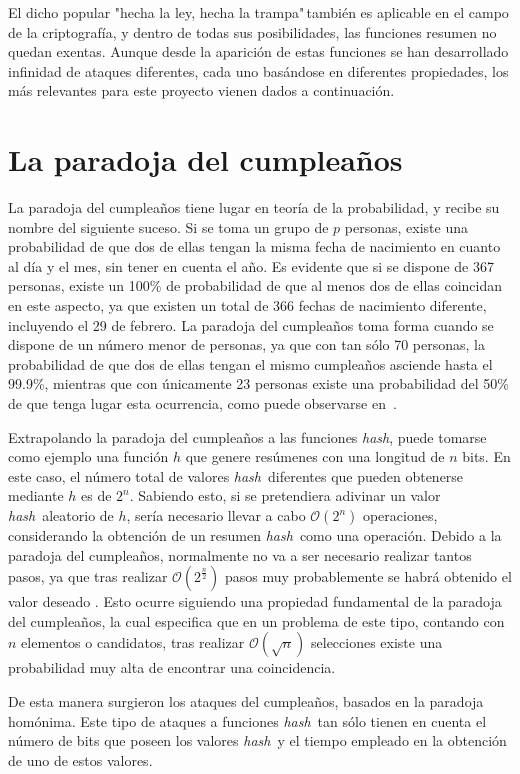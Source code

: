 \documentclass[12pt,spanish,listoffigures,listoftables,listofalgorithms]{tfgetsinf}
\newcommand{\hash}{\textit{hash}}
\begin{document}
El dicho popular "hecha la ley, hecha la trampa"\,también es aplicable en el campo de la criptografía, y dentro de todas sus posibilidades, las funciones resumen no quedan exentas. Aunque desde la aparición de estas funciones se han desarrollado infinidad de ataques diferentes, cada uno basándose en diferentes propiedades, los más relevantes para este proyecto vienen dados a continuación.

\section{La paradoja del cumpleaños}

La paradoja del cumpleaños tiene lugar en teoría de la probabilidad, y recibe su nombre del siguiente suceso. Si se toma un grupo de $p$ personas, existe una probabilidad de que dos de ellas tengan la misma fecha de nacimiento en cuanto al día y el mes, sin tener en cuenta el año. Es evidente que si se dispone de 367 personas, existe un 100\% de probabilidad de que al menos dos de ellas coincidan en este aspecto, ya que existen un total de 366 fechas de nacimiento diferente, incluyendo el 29 de febrero. La paradoja del cumpleaños toma forma cuando se dispone de un número menor de personas, ya que con tan sólo 70 personas, la probabilidad de que dos de ellas tengan el mismo cumpleaños asciende hasta el 99.9\%, mientras que con únicamente 23 personas existe una probabilidad del 50\% de que tenga lugar esta ocurrencia, como puede observarse en~\cite{birthday}.

Extrapolando la paradoja del cumpleaños a las funciones \hash, puede tomarse como ejemplo una función $h$ que genere resúmenes con una longitud de $n$ bits. En este caso, el número total de valores \hash~diferentes que pueden obtenerse mediante $h$ es de $2^n$. Sabiendo esto, si se pretendiera adivinar un valor \hash~aleatorio de $h$, sería necesario llevar a cabo $\mathcal{O}(2^n)$ operaciones, considerando la obtención de un resumen \hash~como una operación. Debido a la paradoja del cumpleaños, normalmente no va a ser necesario realizar tantos pasos, ya que tras realizar $\mathcal{O}(2^{\frac{n}{2}})$ pasos muy probablemente se habrá obtenido el valor deseado \cite{handbook}. Esto ocurre siguiendo una propiedad fundamental de la paradoja del cumpleaños, la cual especifica que en un problema de este tipo, contando con $n$ elementos o candidatos, tras realizar $\mathcal{O}(\sqrt{n})$ selecciones existe una probabilidad muy alta de encontrar una coincidencia.

De esta manera surgieron los ataques del cumpleaños, basados en la paradoja homónima. Este tipo de ataques a funciones \hash~tan sólo tienen en cuenta el número de bits que poseen los valores \hash~y el tiempo empleado en la obtención de uno de estos valores.
\end{document}
